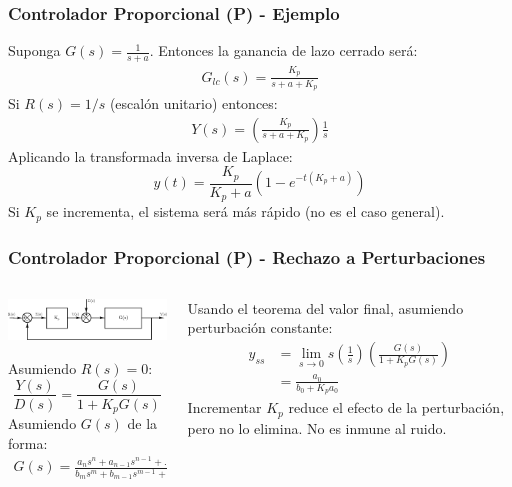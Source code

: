 \documentclass[aspectratio=169,handout]{beamer}
\theoremstyle{definition}
\theoremstyle{plain}
\theoremstyle{remark}
\begin{document}
\begin{frame}[<+->]\frametitle{Controlador Proporcional (P) - Ejemplo}
  Suponga  $G(s) = \frac{1}{s+a}$. Entonces la ganancia de lazo cerrado será:
  \begin{align*}
    G_{lc}(s) = \frac{K_p}{s+a+K_p}
  \end{align*}
  \pause
  Si $R(s) = 1/s$ (escalón unitario) entonces:
  \begin{align*}
    Y(s) = \left(\frac{K_p}{s+a+K_p}\right) \frac{1}{s}
  \end{align*}
  \pause
  Aplicando la transformada inversa de Laplace:
  \begin{equation*}
    y(t) = \frac{K_p}{K_p+a} \left(1-e^{-t(K_p+a)}\right)
  \end{equation*}
  \pause
  Si $K_p$ se incrementa, el sistema será más rápido (no es el caso general).
\end{frame}

\begin{frame}[<+->]\frametitle{Controlador Proporcional (P) - Rechazo a Perturbaciones}
\begin{columns}
\begin{column}{0.5\textwidth}
\vspace*{-3mm}
\begin{center}
  \includegraphics[width=7.5cm]{images/PcontrollerwithDisturbance.eps}\\
\end{center}
\pause
Asumiendo $R(s) = 0$:
\begin{equation*}
  \frac{Y(s)}{D(s)} = \frac{G(s)}{1 + K_p G(s)}
\end{equation*}
\pause
Asumiendo $G(s)$ de la forma:
\begin{align*}
  G(s) = \frac{a_n s^n + a_{n-1} s^{n-1} + \dots + a_1 s + a_0}{b_m s^m + b_{m-1} s^{m-1} + \dots + b_1 s + b_0}
\end{align*}
\end{column}
\pause
\begin{column}{0.5\textwidth}
  Usando el teorema del valor final, asumiendo perturbación constante: 
  \begin{align*}
    y_{ss} &= \lim_{s \rightarrow 0} s \left(\frac{1}{s}\right) \left(\frac{G(s)}{1 + K_p G(s)}\right)\\
    &= \frac{a_0}{b_0 + K_p a_0}
  \end{align*}
  \pause
  Incrementar $K_p$ reduce el efecto de la perturbación, pero no lo elimina. No es inmune al ruido.
\end{column}
\end{columns}
\end{frame}
\end{document}
